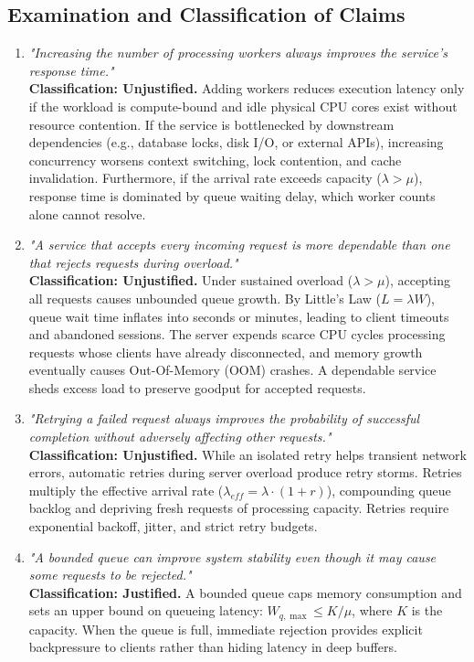 \documentclass[11pt]{article}
\begin{document}
\subsection*{Examination and Classification of Claims}
\begin{enumerate}[label=\textbf{Statement \arabic*:}, leftmargin=1.6em, itemsep=0.4em]
    \item \textit{"Increasing the number of processing workers always improves the service's response time."}\\
    \textbf{Classification: Unjustified.} Adding workers reduces execution latency only if the workload is compute-bound and idle physical CPU cores exist without resource contention. If the service is bottlenecked by downstream dependencies (e.g., database locks, disk I/O, or external APIs), increasing concurrency worsens context switching, lock contention, and cache invalidation. Furthermore, if the arrival rate exceeds capacity ($\lambda > \mu$), response time is dominated by queue waiting delay, which worker counts alone cannot resolve.

    \item \textit{"A service that accepts every incoming request is more dependable than one that rejects requests during overload."}\\
    \textbf{Classification: Unjustified.} Under sustained overload ($\lambda > \mu$), accepting all requests causes unbounded queue growth. By Little's Law ($L = \lambda W$), queue wait time inflates into seconds or minutes, leading to client timeouts and abandoned sessions. The server expends scarce CPU cycles processing requests whose clients have already disconnected, and memory growth eventually causes Out-Of-Memory (OOM) crashes. A dependable service sheds excess load to preserve goodput for accepted requests.

    \item \textit{"Retrying a failed request always improves the probability of successful completion without adversely affecting other requests."}\\
    \textbf{Classification: Unjustified.} While an isolated retry helps transient network errors, automatic retries during server overload produce retry storms. Retries multiply the effective arrival rate ($\lambda_{eff} = \lambda \cdot (1 + r)$), compounding queue backlog and depriving fresh requests of processing capacity. Retries require exponential backoff, jitter, and strict retry budgets.

    \item \textit{"A bounded queue can improve system stability even though it may cause some requests to be rejected."}\\
    \textbf{Classification: Justified.} A bounded queue caps memory consumption and sets an upper bound on queueing latency: $W_{q,\max} \le K / \mu$, where $K$ is the capacity. When the queue is full, immediate rejection provides explicit backpressure to clients rather than hiding latency in deep buffers.


\end{enumerate}
\end{document}
